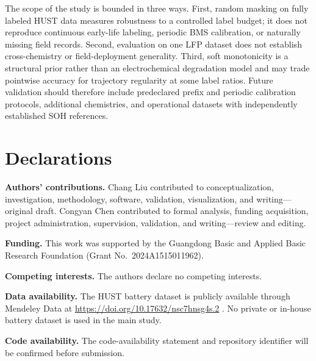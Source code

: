 \documentclass[pdflatex,sn-mathphys-num]{sn-jnl}
\begin{document}
The scope of the study is bounded in three ways. First, random masking on fully labeled HUST data measures robustness to a controlled label budget; it does not reproduce continuous early-life labeling, periodic BMS calibration, or naturally missing field records. Second, evaluation on one LFP dataset does not establish cross-chemistry or field-deployment generality. Third, soft monotonicity is a structural prior rather than an electrochemical degradation model and may trade pointwise accuracy for trajectory regularity at some label ratios. Future validation should therefore include predeclared prefix and periodic calibration protocols, additional chemistries, and operational datasets with independently established SOH references.

\backmatter

\section*{Declarations}

\noindent\textbf{Authors' contributions.}
Chang Liu contributed to conceptualization, investigation, methodology, software, validation, visualization, and writing---original draft. Congyan Chen contributed to formal analysis, funding acquisition, project administration, supervision, validation, and writing---review and editing.

\noindent\textbf{Funding.}
This work was supported by the Guangdong Basic and Applied Basic Research Foundation (Grant No.~2024A1515011962).

\noindent\textbf{Competing interests.}
The authors declare no competing interests.

\noindent\textbf{Data availability.}
The HUST battery dataset is publicly available through Mendeley Data at \url{https://doi.org/10.17632/nsc7hnsg4s.2} \cite{Yuan2022HUSTDataset}. No private or in-house battery dataset is used in the main study.

\noindent\textbf{Code availability.}
The code-availability statement and repository identifier will be confirmed before submission.


\end{document}
